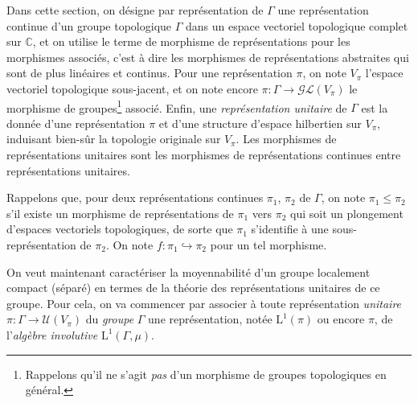 \documentclass[a4paper,12pt]{article}
\newcommand{\C}{\mathbb{C}}
\begin{document}
Dans cette section, on désigne par \og{}représentation de $\Gamma$\fg{} une représentation continue d'un
groupe topologique $\Gamma$ dans un espace vectoriel topologique complet sur $\C$, et on utilise le terme de \og{}morphisme 
de représentations\fg{} pour les morphismes associés, c'est à dire les morphismes de représentations abstraites
qui sont de plus linéaires et continus. Pour une représentation $\pi$, on note $V_\pi$ l'espace 
vectoriel topologique sous-jacent, et on note encore $\pi : \Gamma\to\mathcal{GL}(V_\pi)$ le morphisme 
de groupes\footnote{Rappelons qu'il ne s'agit \emph{pas} d'un morphisme de groupes topologiques en général.} associé.
Enfin, une \emph{représentation unitaire} de $\Gamma$ est la donnée d'une représentation $\pi$ et d'une structure 
d'espace hilbertien sur $V_\pi$, induisant bien-sûr la topologie originale sur $V_\pi$. Les morphismes de représentations 
unitaires sont les morphismes de représentations continues entre représentations unitaires.

Rappelons que, pour deux représentations continues $\pi_1$, $\pi_2$ de $\Gamma$, on note 
$\pi_1\le\pi_2$ s'il existe un morphisme de représentations de $\pi_1$ vers $\pi_2$ qui soit un plongement
d'espaces vectoriels topologiques, de sorte que $\pi_1$ s'identifie à une sous-représentation de $\pi_2$.
On note $f : \pi_1\hookrightarrow\pi_2$ pour un tel morphisme.

On veut maintenant caractériser la moyennabilité d'un groupe localement compact (séparé) en termes
de la théorie des représentations unitaires de ce groupe. Pour cela, on va commencer par associer à toute représentation 
\emph{unitaire} $\pi : \Gamma\to\mathcal{U}(V_\pi)$ du \emph{groupe} $\Gamma$ une
représentation, notée $\mathrm{L}^1(\pi)$ ou encore $\pi$, de l'\emph{algèbre involutive} $\mathrm{L}^1(\Gamma, \mu)$.

\end{document}
